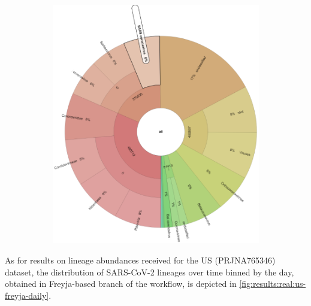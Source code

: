 \begin{figure}[H]
\begin{subfigure}[b]{0.47\textwidth}
        \includegraphics[width=1\textwidth]{figures/results/real/krona/krona-us-sSRR20997582.png}
        \label{fig:results:real:krona-us-c}
        \end{subfigure}
    \end{figure}
    
    As for results on lineage abundances received for the US (PRJNA765346) dataset, the distribution of SARS-CoV-2 lineages over time binned by the day, obtained in Freyja-based branch of the workflow, is depicted in \cref{fig:results:real:us-freyja-daily}.
    

